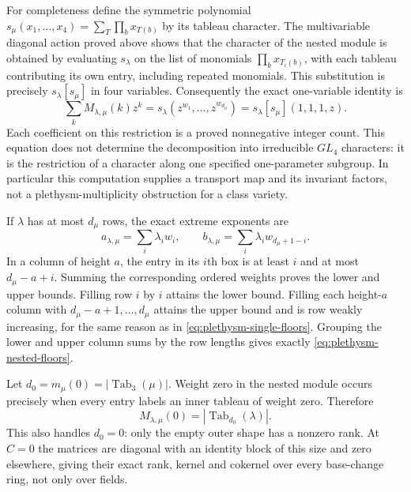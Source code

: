 For completeness define the symmetric polynomial
$s_\mu(x_1,\ldots,x_4)=\sum_T\prod_{b}x_{T(b)}$ by its tableau
character. The multivariable diagonal action proved above shows that
the character of the nested module is obtained by evaluating
$s_\lambda$ on the list of monomials $\prod_bx_{T_i(b)}$, with each
tableau contributing its own entry, including repeated monomials.
This substitution is precisely $s_\lambda[s_\mu]$ in four variables.
Consequently the exact one-variable identity is
\begin{equation}\label{eq:plethysm-character-specialization}
 \sum_kM_{\lambda,\mu}(k)z^k
 =s_\lambda(z^{w_1},\ldots,z^{w_{d_\mu}})
 =s_\lambda[s_\mu](1,1,1,z).
\end{equation}
Each coefficient on this restriction is a proved nonnegative integer
count. This equation does not determine the decomposition into
irreducible $GL_4$ characters: it is the restriction of a character
along one specified one-parameter subgroup. In particular this
computation supplies a transport map and its invariant factors, not
a plethysm-multiplicity obstruction for a class variety.

If $\lambda$ has at most $d_\mu$ rows, the exact extreme exponents are
\begin{equation}\label{eq:plethysm-nested-floors}
 a_{\lambda,\mu}=\sum_i\lambda_iw_i,
 \qquad b_{\lambda,\mu}=\sum_i\lambda_iw_{d_\mu+1-i}.
\end{equation}
In a column of height $a$, the entry in its $i$th box is at least
$i$ and at most $d_\mu-a+i$. Summing the corresponding ordered
weights proves the lower and upper bounds. Filling row $i$ by $i$
attains the lower bound. Filling each height-$a$ column with
$d_\mu-a+1,\ldots,d_\mu$ attains the upper bound and is row weakly
increasing, for the same reason as in
\eqref{eq:plethysm-single-floors}. Grouping the lower and upper
column sums by the row lengths gives exactly
\eqref{eq:plethysm-nested-floors}.

Let $d_0=m_\mu(0)=|\operatorname{Tab}_3(\mu)|$. Weight zero in the
nested module occurs precisely when every entry labels an inner
tableau of weight zero. Therefore
\begin{equation}\label{eq:plethysm-zero-rank}
 M_{\lambda,\mu}(0)=|\operatorname{Tab}_{d_0}(\lambda)|.
\end{equation}
This also handles $d_0=0$: only the empty outer shape has a
nonzero rank. At $C=0$ the matrices are diagonal with an identity
block of this size and zero elsewhere, giving their exact rank,
kernel and cokernel over every base-change ring, not only over fields.

